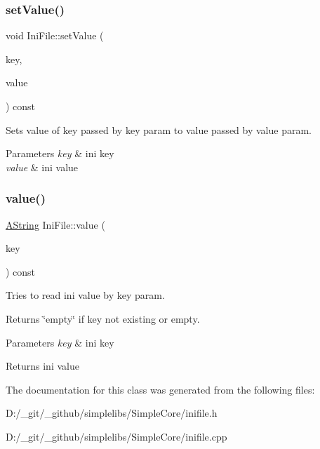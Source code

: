 \subsubsection{\texorpdfstring{setValue()}{setValue()}}
{\footnotesize\ttfamily void Ini\+File\+::set\+Value (\begin{DoxyParamCaption}\item[{const \mbox{\hyperlink{class_a_string}{A\+String}} \&}]{key,  }\item[{const \mbox{\hyperlink{class_a_string}{A\+String}} \&}]{value }\end{DoxyParamCaption}) const}



Sets value of key passed by key param to value passed by value param. 


\begin{DoxyParams}{Parameters}
{\em key} & ini key \\
\hline
{\em value} & ini value \\
\hline
\end{DoxyParams}
\mbox{\label{class_ini_file_acb73544bb44139f7d9b23a36a666abf9}} 
\subsubsection{\texorpdfstring{value()}{value()}}
{\footnotesize\ttfamily \mbox{\hyperlink{class_a_string}{A\+String}} Ini\+File\+::value (\begin{DoxyParamCaption}\item[{const \mbox{\hyperlink{class_a_string}{A\+String}} \&}]{key }\end{DoxyParamCaption}) const}



Tries to read ini value by key param. 

Returns \char`\"{}empty\char`\"{} if key not existing or empty. 
\begin{DoxyParams}{Parameters}
{\em key} & ini key \\
\hline
\end{DoxyParams}
\begin{DoxyReturn}{Returns}
ini value 
\end{DoxyReturn}


The documentation for this class was generated from the following files\+:\begin{DoxyCompactItemize}
\item 
D\+:/\+\_\+git/\+\_\+github/simplelibs/\+Simple\+Core/inifile.\+h\item 
D\+:/\+\_\+git/\+\_\+github/simplelibs/\+Simple\+Core/inifile.\+cpp\end{DoxyCompactItemize}
